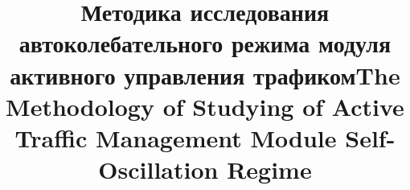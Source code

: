 \begin{Russian}
\begin{Vestnik}


\end{Vestnik}
\end{Russian}

\begin{Russian}
\title{Методика исследования автоколебательного режима модуля активного управления трафиком}
\end{Russian}
\begin{English}
\title{The Methodology of Studying of Active Traffic Management Module Self-Oscillation Regime}
\end{English}

